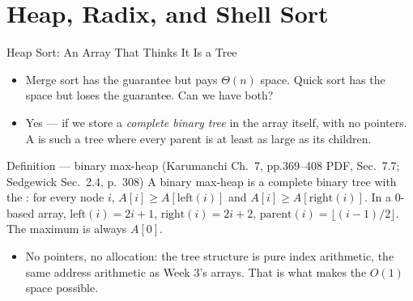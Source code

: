 \documentclass[aspectratio=169]{beamer}
\begin{document}

\section{Heap, Radix, and Shell Sort}


\begin{frame}{Heap Sort: An Array That Thinks It Is a Tree}
  \begin{itemize}
    \item Merge sort has the guarantee but pays $\Theta(n)$ space. Quick sort
      has the space but loses the guarantee. Can we have both?
    \item Yes --- if we store a \emph{complete binary tree} in the array
      itself, with no pointers. A  is such a tree where every
      parent is at least as large as its children.
  \end{itemize}
  \begin{block}{Definition --- binary max-heap (Karumanchi Ch.~7,
    pp.369--408 PDF, Sec.~7.7; Sedgewick Sec.~2.4, p.~308)}
    A binary max-heap is a complete binary tree with the :
    for every node $i$, $A[i] \ge A[\text{left}(i)]$ and
    $A[i] \ge A[\text{right}(i)]$. In a 0-based array,
    $\text{left}(i)=2i+1$, $\text{right}(i)=2i+2$,
    $\text{parent}(i)=\lfloor(i-1)/2\rfloor$. The maximum is always
    $A[0]$.
  \end{block}
  \begin{itemize}
    \item No pointers, no allocation: the tree structure is pure index
      arithmetic, the same address arithmetic as Week 3's arrays. That is
      what makes the $O(1)$ space possible.
  \end{itemize}
\end{frame}
\end{document}
